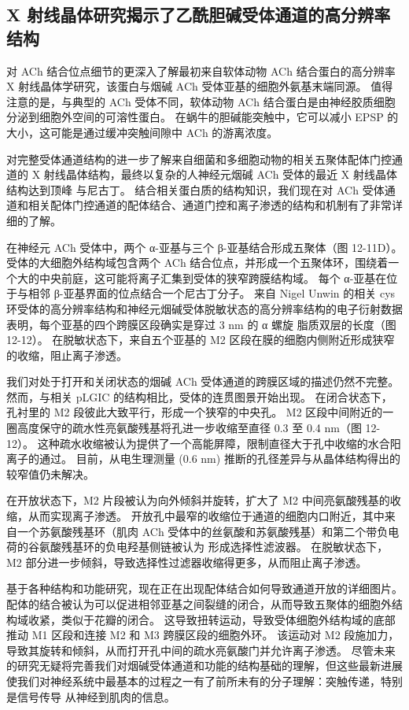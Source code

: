 \subsection{X 射线晶体研究揭示了乙酰胆碱受体通道的高分辨率结构}
对 ACh 结合位点细节的更深入了解最初来自软体动物 ACh 结合蛋白的高分辨率 X 射线晶体学研究，该蛋白与烟碱 ACh 受体亚基的细胞外氨基末端同源。 值得注意的是，与典型的 ACh 受体不同，软体动物 ACh 结合蛋白是由神经胶质细胞分泌到细胞外空间的可溶性蛋白。 在蜗牛的胆碱能突触中，它可以减小 EPSP 的大小，这可能是通过缓冲突触间隙中 ACh 的游离浓度。

对完整受体通道结构的进一步了解来自细菌和多细胞动物的相关五聚体配体门控通道的 X 射线晶体结构，最终以复杂的人神经元烟碱 ACh 受体的最近 X 射线晶体结构达到顶峰 与尼古丁。 结合相关蛋白质的结构知识，我们现在对 ACh 受体通道和相关配体门控通道的配体结合、通道门控和离子渗透的结构和机制有了非常详细的了解。

在神经元 ACh 受体中，两个 α-亚基与三个 β-亚基结合形成五聚体（图 12-11D）。 受体的大细胞外结构域包含两个 ACh 结合位点，并形成一个五聚体环，围绕着一个大的中央前庭，这可能将离子汇集到受体的狭窄跨膜结构域。 每个 α-亚基在位于与相邻 β-亚基界面的位点结合一个尼古丁分子。 来自 Nigel Unwin 的相关 cys 环受体的高分辨率结构和神经元烟碱受体脱敏状态的高分辨率结构的电子衍射数据表明，每个亚基的四个跨膜区段确实是穿过 3 nm 的 α 螺旋 脂质双层的长度（图 12-12）。 在脱敏状态下，来自五个亚基的 M2 区段在膜的细胞内侧附近形成狭窄的收缩，阻止离子渗透。

我们对处于打开和关闭状态的烟碱 ACh 受体通道的跨膜区域的描述仍然不完整。 然而，与相关 pLGIC 的结构相比，受体的连贯图景开始出现。 在闭合状态下，孔衬里的 M2 段彼此大致平行，形成一个狭窄的中央孔。 M2 区段中间附近的一圈高度保守的疏水性亮氨酸残基将孔进一步收缩至直径 0.3 至 0.4 nm（图 12-12）。 这种疏水收缩被认为提供了一个高能屏障，限制直径大于孔中收缩的水合阳离子的通过。 目前，从电生理测量 (0.6 nm) 推断的孔径差异与从晶体结构得出的较窄值仍未解决。

在开放状态下，M2 片段被认为向外倾斜并旋转，扩大了 M2 中间亮氨酸残基的收缩，从而实现离子渗透。 开放孔中最窄的收缩位于通道的细胞内口附近，其中来自一个苏氨酸残基环（肌肉 ACh 受体中的丝氨酸和苏氨酸残基）和第二个带负电荷的谷氨酸残基环的负电羟基侧链被认为 形成选择性滤波器。 在脱敏状态下，M2 部分进一步倾斜，导致选择性过滤器收缩得更多，从而阻止离子渗透。

基于各种结构和功能研究，现在正在出现配体结合如何导致通道开放的详细图片。 配体的结合被认为可以促进相邻亚基之间裂缝的闭合，从而导致五聚体的细胞外结构域收紧，类似于花瓣的闭合。 这导致扭转运动，导致受体细胞外结构域的底部推动 M1 区段和连接 M2 和 M3 跨膜区段的细胞外环。 该运动对 M2 段施加力，导致其旋转和倾斜，从而打开孔中间的疏水亮氨酸门并允许离子渗透。 尽管未来的研究无疑将完善我们对烟碱受体通道和功能的结构基础的理解，但这些最新进展使我们对神经系统中最基本的过程之一有了前所未有的分子理解：突触传递，特别是信号传导 从神经到肌肉的信息。


